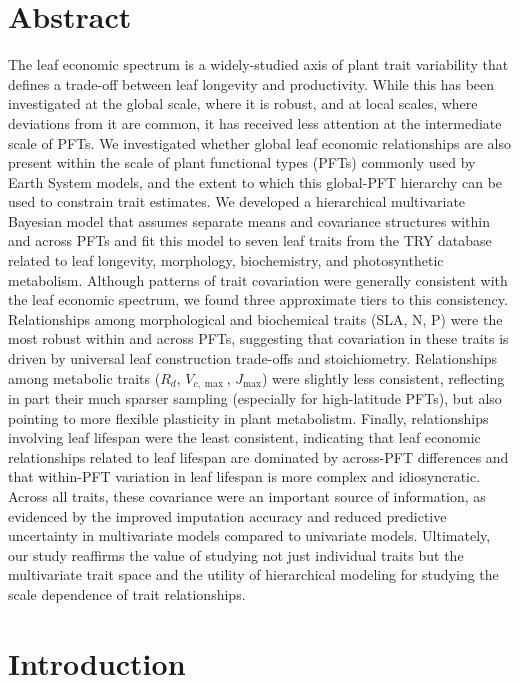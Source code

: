 \documentclass{article}
\begin{document}
\section{Abstract}
The leaf economic spectrum is a widely-studied axis of plant trait variability that defines a trade-off between leaf longevity and productivity.
While this has been investigated at the global scale, where it is robust, and at local scales, where deviations from it are common, it has received less attention at the intermediate scale of PFTs.
We investigated whether global leaf economic relationships are also present within the scale of plant functional types (PFTs) commonly used by Earth System models, and the extent to which this global-PFT hierarchy can be used to constrain trait estimates.
We developed a hierarchical multivariate Bayesian model that assumes separate means and covariance structures within and across PFTs and fit this model to seven leaf traits from the TRY database related to leaf longevity, morphology, biochemistry, and photosynthetic metabolism.
Although patterns of trait covariation were generally consistent with the leaf economic spectrum, we found three approximate tiers to this consistency.
Relationships among morphological and biochemical traits (SLA, N, P) were the most robust within and across PFTs, suggesting that covariation in these traits is driven by universal leaf construction trade-offs and stoichiometry.
Relationships among metabolic traits ($R_d$, $V_{c,\max}$, $J_{\max}$) were slightly less consistent, reflecting in part their much sparser sampling (especially for high-latitude PFTs), but also pointing to more flexible plasticity in plant metabolistm.
Finally, relationships involving leaf lifespan were the least consistent, indicating that leaf economic relationships related to leaf lifespan are dominated by across-PFT differences and that within-PFT variation in leaf lifespan is more complex and idiosyncratic.
Across all traits, these covariance were an important source of information, as evidenced by the improved imputation accuracy and reduced predictive uncertainty in multivariate models compared to univariate models.
Ultimately, our study reaffirms the value of studying not just individual traits but the multivariate trait space and the utility of hierarchical modeling for studying the scale dependence of trait relationships.

\section{Introduction}
\end{document}
